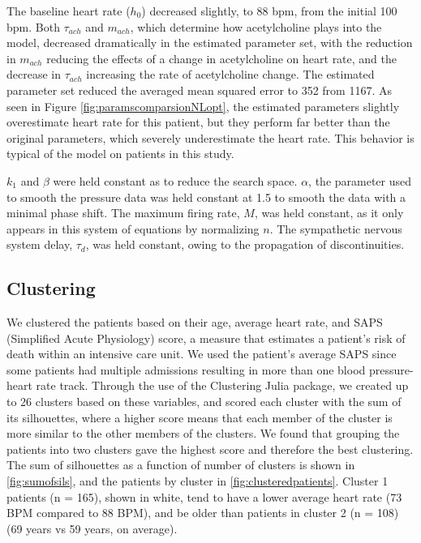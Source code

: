 \documentclass[fleqn,10pt]{wlscirep}
\begin{document}
The baseline heart rate ($h_0$) decreased slightly, to 88 bpm, from the initial 100 bpm. Both $\tau_{ach}$ and $m_{ach}$, which determine how acetylcholine plays into the model, decreased dramatically in the estimated parameter set, with the reduction in $m_{ach}$ reducing the effects of a change in acetylcholine on heart rate, and the decrease in $\tau_{ach}$ increasing the rate of acetylcholine change. The estimated parameter set reduced the averaged mean squared error to 352 from 1167. As seen in Figure \ref{fig:paramscomparsionNLopt}, the estimated parameters slightly overestimate heart rate for this patient, but they perform far better than the original parameters, which severely underestimate the heart rate. This behavior is typical of the model on patients in this study.

$k_1$ and $\beta$ were held constant as to reduce the search space. $\alpha$, the parameter used to smooth the pressure data was held constant at 1.5 to smooth the data with a minimal phase shift. The maximum firing rate, $M$, was held constant, as it only appears in this system of equations by normalizing $n$. The sympathetic nervous system delay, $\tau_d$, was held constant, owing to the propagation of discontinuities. \cite{baker1997pitfalls}


\subsection*{Clustering}
We clustered the patients based on their age, average heart rate, and SAPS (Simplified Acute Physiology) score, a measure that estimates a patient's risk of death within an intensive care unit.\cite{le1993new} We used the patient's average SAPS since some patients had multiple admissions resulting in more than one blood pressure-heart rate track. 
Through the use of the Clustering Julia package, we created up to 26 clusters based on these variables, and scored each cluster with the sum of its silhouettes, where a higher score means that each member of the cluster is more similar to the other members of the clusters.\cite{rousseeuw1987silhouettes} We found that grouping the patients into two clusters gave the highest score and therefore the best clustering. The sum of silhouettes as a function of number of clusters is shown in \ref{fig:sumofsils}, and the patients by cluster in \ref{fig:clusteredpatients}. Cluster 1 patients (n = 165), shown in white, tend to have a lower average heart rate (73 BPM compared to 88 BPM), and be older than patients in cluster 2 (n = 108) (69 years vs 59 years, on average). 
\end{document}
